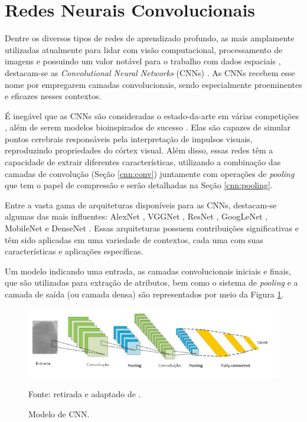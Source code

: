 \newpage
\clearpage

\section{Redes Neurais Convolucionais}
\label{cnn}

Dentre os diversos tipos de redes de aprendizado profundo, as mais amplamente utilizadas atualmente para lidar com visão computacional, processamento de imagens e possuindo um valor notável para o trabalho com dados espaciais \citep{Goodfellow2016, ponti2018funciona, Ghosh2019}, destacam-se as \textit{Convolutional Neural Networks} (CNNs) \citep{LeCun1999}. As CNNs recebem esse nome por empregarem camadas convolucionais, sendo especialmente proeminentes e eficazes nesses contextos.

É inegável que as CNNs são consideradas o estado-da-arte em várias competições \citep{Parkhi2015}, além de serem modelos bioinspirados de sucesso \citep{Goodfellow2016}. Elas são capazes de simular pontos cerebrais responsáveis pela interpretação de impulsos visuais, reproduzindo propriedades do córtex visual. Além disso, essas redes têm a capacidade de extrair diferentes características, utilizando a combinação das camadas de convolução (Seção \ref{cnn:conv}) juntamente com operações de \textit{pooling} que tem o papel de compressão e serão detalhadas na Seção \ref{cnn:pooling}.

Entre a vasta gama de arquiteturas disponíveis para as CNNs, destacam-se algumas das mais influentes: AlexNet \citep{krizhevsky2012imagenet}, VGGNet \citep{Simonyan2015}, ResNet \citep{He2016}, GoogLeNet \citep{Szegedy2015}, MobileNet \citep{Howard2017} e DenseNet \citep{Huang2017}. Essas arquiteturas possuem contribuições significativas e têm sido aplicadas em uma variedade de contextos, cada uma com suas características e aplicações específicas.

Um modelo indicando uma entrada, as camadas convolucionais iniciais e finais, que são utilizadas para extração de atributos, bem como o sistema de \textit{pooling} e a camada de saída (ou camada densa) são representados por meio da Figura \ref{cnn:fig:10}.

\begin{figure}[H]
    \centering
    \caption{Modelo de CNN.}
    \includegraphics[width=1\linewidth]{recursos/imagens/deep/cnn.jpg}
    \label{cnn:fig:10}

    Fonte: retirada e adaptado de \cite{Minaee2021DeepClassification}.
\end{figure}

